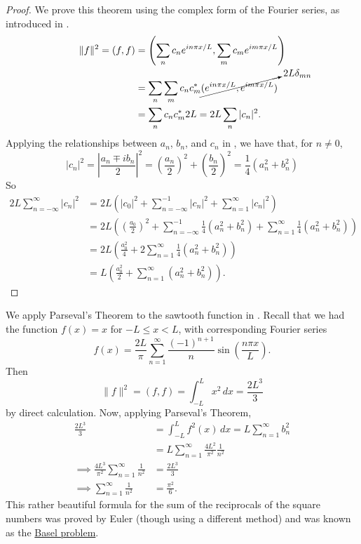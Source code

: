 \begin{proof}
	We prove this theorem using the complex form of the Fourier series, as introduced in .
	\begin{align*}
		\lVert f\rVert^2 = (f,f) &= \left(\sum_n c_n e^{in\pi x/L}, \sum_m c_m e^{im\pi x/L}\right) \\
		&= \sum_n \sum_m c_n c_m^* \cancelto{2L\delta_{mn}}{(e^{in\pi x/L}, e^{im\pi x/L})} \\
		&= \sum_n c_n c_m^* 2L = 2L \sum_n |c_n|^2.
	\end{align*}
	Applying the relationships between $a_n$, $b_n$, and $c_n$ in , we have that, for $n\neq0$,
	\[
	|c_n|^2 = \left|\frac{a_n \mp ib_n}{2}\right|^2 = \left(\frac{a_n}{2}\right)^2 + \left(\frac{b_n}{2}\right)^2 = \frac14(a_n^2 + b_n^2)
	\]
	So
	\begin{align*}
		2L\sum_{n=-\infty}^{\infty} |c_n|^2 &= 2L\left( |c_0|^2 + \sum_{n=-\infty}^{-1} |c_n|^2 + \sum_{n=1}^{\infty} |c_n|^2 \right) \\
		&= 2L\left( \left(\frac{a_0}{2}\right)^2 + \sum_{n=-\infty}^{-1} \frac14(a_n^2 + b_n^2) + \sum_{n=1}^{\infty} \frac14(a_n^2 + b_n^2)\right) \\
		&= 2L\left(\frac{a_0^2}{4} + 2\sum_{n=1}^{\infty} \frac14(a_n^2 + b_n^2)\right) \\
		&= L\left(\frac{a_0^2}{2} + \sum_{n=1}^{\infty}(a_n^2 + b_n^2)\right).
	\end{align*}
\end{proof}

\begin{eg}
	We apply Parseval's Theorem to the sawtooth function in . Recall that we had the function $f(x) = x$ for $-L\leq x < L$, with corresponding Fourier series
	\[
	f(x) = \frac{2L}{\pi} \sum_{n=1}^{\infty} \frac{(-1)^{n+1}}{n} \sin\left(\frac{n\pi x}{L}\right).
	\]
	Then
	\[
	\lVert f \rVert^2 = (f,f) = \int_{-L}^L x^2 \,dx = \frac{2L^3}{3}
	\]
	by direct calculation. Now, applying Parseval's Theorem,
	\begin{align*}
		\frac{2L^3}{3} &= \int_{-L}^L f^2(x) \,dx = L \sum_{n=1}^{\infty} b_n^2 \\
		&= L \sum_{n=1}^{\infty} \frac{4L^2}{\pi^2} \frac{1}{n^2} \\
		\implies \frac{4L^3}{\pi^2} \sum_{n=1}^{\infty} \frac{1}{n^2} &= \frac{2L^3}{3} \\
		\implies \sum_{n=1}^{\infty} \frac{1}{n^2} &= \frac{\pi^2}{6}.
	\end{align*}
	This rather beautiful formula for the sum of the reciprocals of the square numbers was proved by Euler (though using a different method) and was known as the \href{https://en.wikipedia.org/wiki/Basel_problem}{Basel problem}.
\end{eg}